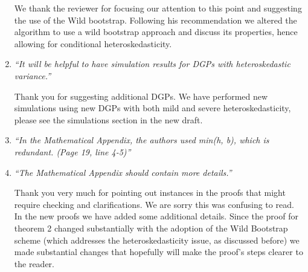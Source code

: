 \documentclass[12pt,fleqn]{article}
\begin{document}
\begin{enumerate}
 We thank the reviewer for focusing our attention to this point and suggesting the use of the Wild bootstrap. Following his recommendation we altered the algorithm to use a wild bootstrap approach and discuss its properties, hence allowing for conditional heteroskedasticity.

\item \textit{``It will be helpful to have simulation results for DGPs with heteroskedastic variance.''}

 Thank you for suggesting additional DGPs. We have performed new simulations using new DGPs with both mild and severe heteroskedasticity, please see the simulations section in the new draft.

\item \textit{``In the Mathematical Appendix, the authors used min(h, b), which is redundant. (Page 19, line 4-5)''}


\item \textit{``The Mathematical Appendix should contain more details.''}

Thank you very much for pointing out instances in the proofs that might require checking and clarifications. We are sorry this was confusing to read. In the new proofs we have added some additional details. Since the proof for theorem 2 changed substantially with the adoption of the Wild Bootstrap scheme (which addresses the heteroskedasticity issue, as discussed before) we made substantial changes that hopefully will make the proof's steps clearer to the reader. 

\end{enumerate}
\end{document}
